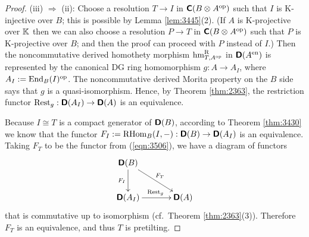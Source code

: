 \begin{proof}
\medskip \noindent
(iii) $\Rightarrow$ (ii): 
Choose a resolution $T \to I$ in $\boldsymbol{\mathsf{C}}(B \otimes_{} A^{\mathrm{op}})$
such that $I$ is K-injective over $B$; this is possible by Lemma 
\ref{lem:3445}(2). (If $A$ is K-projective over $\mathbb{K}$ then we can also 
choose a resolution $P \to T$ in $\boldsymbol{\mathsf{C}}(B \otimes_{} A^{\mathrm{op}})$
such that $P$ is K-projective over $B$; and then the proof can proceed with $P$ 
instead of $I$.) Then the noncommutative derived homothety morphism 
$\operatorname{hm}^{\mathrm{R}}_{T, A^{\mathrm{op}}}$ in $\boldsymbol{\mathsf{D}}(A^{\mathrm{en}})$ is 
represented by the canonical DG 
ring homomorphism $g : A \to A_I$, where 
$A_I := \operatorname{End}_B(I)^{\mathrm{op}}$.
The noncommutative derived Morita property on the $B$ side says that 
$g$ is a quasi-isomorphism. Hence, by Theorem \ref{thm:2363}, 
the restriction functor 
$\operatorname{Rest}_{g} : \boldsymbol{\mathsf{D}}(A_I) \to \boldsymbol{\mathsf{D}}(A)$
is an equivalence. 

Because $I \cong T$ is a compact generator of $\boldsymbol{\mathsf{D}}(B)$, according to 
Theorem \ref{thm:3430} we know that the functor 
$F_I := \operatorname{RHom}_B(I, -) : \boldsymbol{\mathsf{D}}(B) \to \boldsymbol{\mathsf{D}}(A_I)$
is an equivalence. Taking $F_T$ to be the functor from (\ref{eqn:3506}),
we have a diagram of functors 
\[ \UseTips \xymatrix @C=8ex @R=6ex {
\dcat{D}(B)
\ar[d]_{F_I}
\ar[dr]^{F_T}
\\
\dcat{D}(A_I)
\ar[r]^{\opn{Rest}_{g}}
&
\dcat{D}(A)
} \]
that is commutative up to isomorphism (cf.\ Theorem \ref{thm:2363}(3)).
Therefore $F_T$ is an equivalence, and thus $T$ is pretilting. 


\end{proof}
